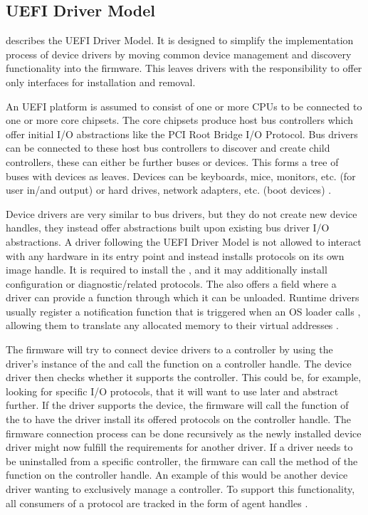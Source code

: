 \subsection{\acs{UEFI} Driver Model}

\cite[Section 2.5]{uefi-spec} describes the \acs{UEFI} Driver Model.
It is designed to simplify the implementation process of device drivers by moving common device management and discovery functionality into the firmware.
This leaves drivers with the responsibility to offer only interfaces for installation and removal.

An \ac{UEFI} platform is assumed to consist of one or more \acp{CPU} to be connected to one or more core chipsets.
The core chipsets produce host bus controllers which offer initial \ac{I/O} abstractions like the \ac{PCI} Root Bridge \ac{I/O} Protocol.
Bus drivers can be connected to these host bus controllers to discover and create child controllers, these can either be further buses or devices.
This forms a tree of buses with devices as leaves.
Devices can be keyboards, mice, monitors, etc. (for user in\-/and output) or hard drives, network adapters, etc. (boot devices) \cite[Section 2.5]{uefi-spec}.

Device drivers are very similar to bus drivers, but they do not create new device handles, they instead offer abstractions built upon existing bus driver \ac{I/O} abstractions.
A driver following the \ac{UEFI} Driver Model is not allowed to interact with any hardware in its entry point and instead installs protocols on its own image handle.
It is required to install the , and it may additionally install configuration or diagnostic\-/related protocols.
The  also offers a field where a driver can provide a function through which it can be unloaded.
Runtime drivers usually register a notification function that is triggered when an \ac{OS} loader calls , allowing them to translate any allocated memory to their virtual addresses \cite[Section 2.5.2]{uefi-spec}.

The firmware will try to connect device drivers to a controller by using the driver's instance of the  and call the  function on a controller handle.
The device driver then checks whether it supports the controller.
This could be, for example, looking for specific \ac{I/O} protocols, that it will want to use later and abstract further.
If the driver supports the device, the firmware will call the  function of the  to have the driver install its offered protocols on the controller handle.
The firmware connection process can be done recursively as the newly installed device driver might now fulfill the requirements for another driver.
If a driver needs to be uninstalled from a specific controller, the firmware can call the  method of the  function on the controller handle.
An example of this would be another device driver wanting to exclusively manage a controller.
To support this functionality, all consumers of a protocol are tracked in the form of agent handles \cite[Section 2.5.4]{uefi-spec}.

